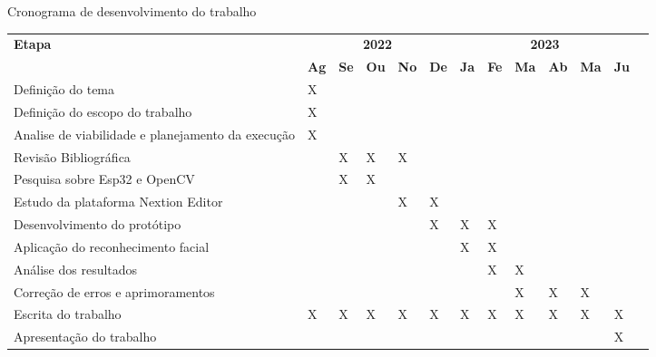 \begin{tabframed}[htb]
    \caption{Cronograma de desenvolvimento do trabalho}
    \label{quad:quadro1}
    \begin{tabular}{|l|*{12}{p{}|}}
    \hline
    \multirow{2}{*}{\textbf{Etapa}} & \multicolumn{5}{c|}{\textbf{2022}} & \multicolumn{6}{c|}{\textbf{2023}} \\  
    \cline{2-12}
    &\textbf{Ag} &\textbf{Se} &\textbf{Ou} &\textbf{No} &\textbf{De} &\textbf{Ja} &\textbf{Fe} &\textbf{Ma} &\textbf{Ab} &\textbf{Ma} &\textbf{Ju} \\ \hline
    Definição do tema                                 &X & & & & & & & & & & \\   \hline
    Definição do escopo do trabalho                   &X & & & & & & & & & & \\   \hline
    Analise de viabilidade e planejamento da execução &X & & & & & & & & & & \\   \hline
    Revisão Bibliográfica                             & &X &X &X & & & & & & & \\ \hline
    Pesquisa sobre Esp32 e OpenCV                     & &X &X & & & & & & & & \\  \hline
    Estudo da plataforma Nextion Editor               & & & &X &X & & & & & & \\  \hline
    Desenvolvimento do protótipo                      & & & & &X &X &X & & & & \\ \hline
    Aplicação do reconhecimento facial                & & & & & &X &X & & & & \\  \hline
    Análise dos resultados                            & & & & & & &X &X & & & \\  \hline
    Correção de erros e aprimoramentos                & & & & & & & &X &X &X & \\ \hline
    Escrita do trabalho                               &X &X &X &X &X &X &X &X &X &X &X \\ \hline
    Apresentação do trabalho                          & & & & & & & & & & &X \\   \hline
    \end{tabular}
    \fonte{}%
\end{tabframed}
